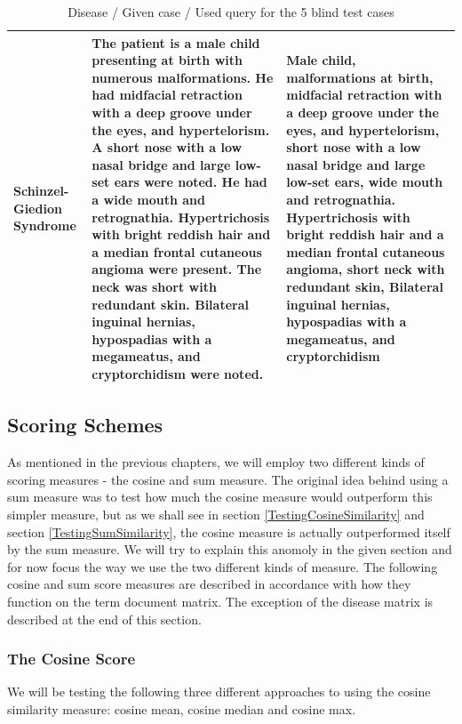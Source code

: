 \begin{table}[H]
\begin{scriptsize}
\begin{tabular}{| p{3cm} | p{4.5cm} | p{4.5cm} |}
      Schinzel-Giedion Syndrome & The patient is a male child presenting at birth with numerous malformations. He had midfacial retraction with a deep groove under the eyes, and hypertelorism. A short nose with a low nasal bridge and large low-set ears were noted. He had a wide mouth and retrognathia. Hypertrichosis with bright reddish hair and a median frontal cutaneous angioma were present. The neck was short with redundant skin. Bilateral inguinal hernias, hypospadias with a megameatus, and cryptorchidism were noted. & Male child, malformations at birth, midfacial retraction with a deep groove under the eyes, and hypertelorism, short nose with a low nasal bridge and large low-set ears, wide mouth and retrognathia. Hypertrichosis with bright reddish hair and a median frontal cutaneous angioma, short neck with redundant skin, Bilateral inguinal hernias, hypospadias with a megameatus, and cryptorchidism \\
      \hline
    \end{tabular}
  \end{scriptsize}
  \caption{Disease / Given case / Used query for the 5 blind test cases}
  \label{BlindTestDiseaseName}
\end{table}

\subsection{Scoring Schemes\label{ScoringSchemes}}

As mentioned in the previous chapters, we will employ two different
kinds of scoring measures - the cosine and sum measure. The original
idea behind using a sum measure was to test how much the cosine
measure would outperform this simpler measure, but as we shall see in
section \ref{TestingCosineSimilarity} and section
\ref{TestingSumSimilarity}, the cosine measure is actually
outperformed itself by the sum measure. We will try to explain this
anomoly in the given section and for now focus the way we use the two
different kinds of measure. The following cosine and sum score
measures are described in accordance with how they function on the term
document matrix. The exception of the disease matrix is described at
the end of this section.

\subsubsection{The Cosine Score\label{CosineScore}}

We will be testing the following three different approaches to using
the cosine similarity measure: cosine mean, cosine median and cosine
max.

